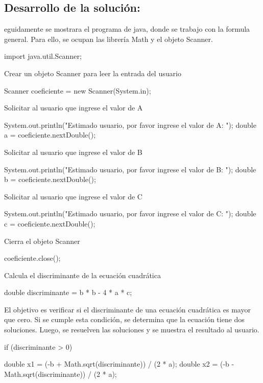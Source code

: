 \subsection{\textbf{Desarrollo de la solución:}}
eguidamente se mostrara el programa de java, donde se trabajo con la formula general. Para ello, se ocupan las librería Math y el objeto Scanner.
\begin{javaCode}
    
import java.util.Scanner;

    
        Crear un objeto Scanner para leer la entrada del usuario
        \begin{javaCode}
        Scanner coeficiente = new Scanner(System.in);
        \end{javaCode}
        Solicitar al usuario que ingrese el valor de A
        \begin{javaCode}
        System.out.println("Estimado usuario, por favor ingrese el valor de A: ");
        double a = coeficiente.nextDouble();
        \end{javaCode}
        Solicitar al usuario que ingrese el valor de B
        \begin{javaCode}
        System.out.println("Estimado usuario, por favor ingrese el valor de B: ");
        double b = coeficiente.nextDouble();
        \end{javaCode}
        Solicitar al usuario que ingrese el valor de C
        \begin{javaCode}
        System.out.println("Estimado usuario, por favor ingrese el valor de C: ");
        double c = coeficiente.nextDouble();
        \end{javaCode}
        Cierra el objeto Scanner
        \begin{javaCode}
        coeficiente.close();
        \end{javaCode}
        Calcula el discriminante de la ecuación cuadrática
        \begin{javaCode}
        double discriminante = b * b - 4 * a * c;
        \end{javaCode}
       El objetivo es verificar si el discriminante de una ecuación cuadrática es mayor que cero. Si se cumple esta condición, se determina que la ecuación tiene dos soluciones. Luego, se resuelven las soluciones y se muestra el resultado al usuario.
        \begin{javaCode}
        if (discriminante > 0) {
            double x1 = (-b + Math.sqrt(discriminante)) / (2 * a);
            double x2 = (-b - Math.sqrt(discriminante)) / (2 * a);
       
}
\end{javaCode}
\end{javaCode}
